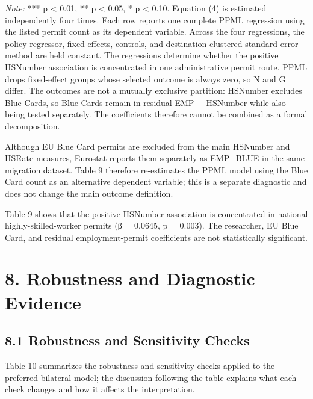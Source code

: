\documentclass[11pt,a4paper]{article}
\newcommand{\TableNote}[1]{%
  \par\vspace{-0.35em}\noindent
  \begin{minipage}{\linewidth}\footnotesize\setstretch{1.05}\textit{Note:} #1\end{minipage}
  \par\vspace{0.65em}%
}
\begin{document}
\TableNote{*** p \textless{} 0.01, ** p \textless{} 0.05, * p
\textless{} 0.10. Equation (4) is estimated independently four times.
Each row reports one complete PPML regression using the listed permit
count as its dependent variable. Across the four regressions, the policy
regressor, fixed effects, controls, and destination-clustered
standard-error method are held constant. The regressions determine
whether the positive HSNumber association is concentrated in one
administrative permit route. PPML drops fixed-effect groups whose
selected outcome is always zero, so N and G differ. The outcomes are not
a mutually exclusive partition: HSNumber excludes Blue Cards, so Blue
Cards remain in residual EMP − HSNumber while also being tested
separately. The coefficients therefore cannot be combined as a formal
decomposition.}

Although EU Blue Card permits are excluded from the main HSNumber and
HSRate measures, Eurostat reports them separately as EMP\_BLUE in the
same migration dataset. Table 9 therefore re-estimates the PPML model
using the Blue Card count as an alternative dependent variable; this is
a separate diagnostic and does not change the main outcome definition.

Table 9 shows that the positive HSNumber association is concentrated in
national highly-skilled-worker permits (β = 0.0645, p = 0.003). The
researcher, EU Blue Card, and residual employment-permit coefficients
are not statistically significant.

\clearpage
\section{8. Robustness and Diagnostic
Evidence}\label{robustness-and-diagnostic-evidence}

\subsection{8.1 Robustness and Sensitivity
Checks}\label{robustness-and-sensitivity-checks}

Table 10 summarizes the robustness and sensitivity checks applied to the
preferred bilateral model; the discussion following the table explains
what each check changes and how it affects the interpretation.
\end{document}
